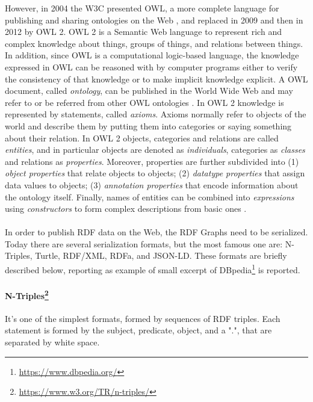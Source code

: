 However, in 2004 the \acl{W3C} presented \ac{OWL}, a more complete language for publishing and sharing ontologies on the Web \cite{bechhofer2004owl}, and replaced in 2009 and then in 2012 by \ac{OWL} 2. \ac{OWL} 2 is a Semantic Web language to represent rich and complex knowledge about things, groups of things, and relations between things. In addition, since \ac{OWL} is a computational logic-based language, the knowledge expressed in \ac{OWL} can be reasoned with by computer programs either to verify the consistency of that knowledge or to make implicit knowledge explicit. A \ac{OWL} document, called \textit{ontology}, can be published in the World Wide Web and may refer to or be referred from other \ac{OWL} ontologies \cite{hitzler2009owl}. In \ac{OWL} 2 knowledge is represented by statements, called \textit{axioms}. Axioms normally refer to objects of the world and describe them by putting them into categories or saying something about their relation. In \ac{OWL} 2 objects, categories and relations are called \textit{entities}, and in particular objects are denoted as \textit{individuals}, categories as \textit{classes} and relations as \textit{properties}. Moreover, properties are further subdivided into (1) \textit{object properties} that relate objects to objects; (2) \textit{datatype properties} that assign data values to objects; (3) \textit{annotation properties} that encode information about the ontology itself. Finally, names of entities can be combined into \textit{expressions} using \textit{constructors} to form complex descriptions from basic ones \cite{hitzler2009owl}.

\paragraph*{}
In order to publish \ac{RDF} data on the Web, the \ac{RDF} Graphs need to be serialized. Today there are several serialization formats, but the most famous one are: N-Triples, Turtle, RDF/XML, RDFa, and JSON-LD. These formats are briefly described below, reporting as example of small excerpt of DBpedia\footnote{\url{https://www.dbpedia.org/}} is reported.

\paragraph*{N-Triples\footnote{\url{https://www.w3.org/TR/n-triples/}}} It's one of the simplest formats, formed by sequences of \ac{RDF} triples. Each statement is formed by the subject, predicate, object, and a ".", that are separated by white space.

